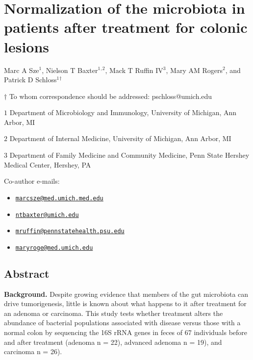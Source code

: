 \documentclass[12pt,]{article}
\title{}
\author{}
\date{}
\providecommand{\tightlist}{%
  \setlength{\itemsep}{0pt}\setlength{\parskip}{0pt}}
\begin{document}
\section{Normalization of the microbiota in patients after treatment for
colonic
lesions}\label{normalization-of-the-microbiota-in-patients-after-treatment-for-colonic-lesions}

\begin{center}
\vspace{25mm}

Marc A Sze${^1}$, Nielson T Baxter${^1}$${^,}$${^2}$, Mack T Ruffin IV${^3}$, Mary AM Rogers${^2}$, and Patrick D Schloss${^1}$${^\dagger}$

\vspace{20mm}

$\dagger$ To whom correspondence should be addressed: pschloss@umich.edu

$1$ Department of Microbiology and Immunology, University of Michigan, Ann Arbor, MI

$2$ Department of Internal Medicine, University of Michigan, Ann Arbor, MI

$3$ Department of Family Medicine and Community Medicine, Penn State Hershey Medical Center, Hershey, PA


\end{center}

Co-author e-mails:

\begin{itemize}
\tightlist
\item
  \href{mailto:marcsze@med.umich.med.edu}{\nolinkurl{marcsze@med.umich.med.edu}}
\item
  \href{mailto:ntbaxter@umich.edu}{\nolinkurl{ntbaxter@umich.edu}}
\item
  \href{mailto:mruffin@pennstatehealth.psu.edu}{\nolinkurl{mruffin@pennstatehealth.psu.edu}}
\item
  \href{mailto:maryroge@med.umich.edu}{\nolinkurl{maryroge@med.umich.edu}}
\end{itemize}

\newpage

\linenumbers

\subsection{Abstract}\label{abstract}

\textbf{Background.} Despite growing evidence that members of the gut
microbiota can drive tumorigenesis, little is known about what happens
to it after treatment for an adenoma or carcinoma. This study tests
whether treatment alters the abundance of bacterial populations
associated with disease versus those with a normal colon by sequencing
the 16S rRNA genes in feces of 67 individuals before and after treatment
(adenoma n = 22), advanced adenoma n = 19), and carcinoma n = 26).
\end{document}
